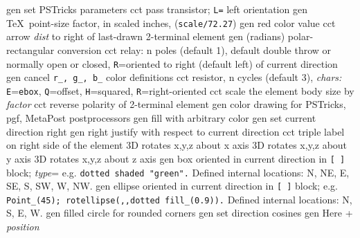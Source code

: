   {gen}
  {set PSTricks parameters}
  {cct}
  {pass transistor; {\tt L=} left orientation}
  {gen}
  {\TeX\ point-size factor, in scaled inches, ({\tt *scale/72.27})}
  {gen}
  {red color value}
  {cct}
  {arrow {\sl dist} to right of last-drawn 2-terminal element}
  {gen}
  {(radians) polar-rectangular conversion}
  {cct}
  {relay: n poles (default 1), default double throw or normally open
    or closed, {\tt R}=oriented to right (default left) of current direction}
  {gen}
  {cancel {\tt r\_, g\_, b\_} color definitions}
  {cct}
  {resistor, n cycles (default 3), {\sl chars:} {\tt E}={\tt ebox},
    {\tt Q}=offset, {\tt H}=squared, {\tt R}=right-oriented }
  {cct}
  {scale the element body size by {\sl factor}}
  {cct}
  {reverse polarity of 2-terminal element}
  {gen}
  {color drawing for PSTricks, pgf, MetaPost postprocessors }
  {gen}
  {fill with arbitrary color}
  {gen}
  {set current direction right}
  {gen}
  {right justify with respect to current direction}
  {cct}
  {triple label on right side of the element}
  {3D}
  {rotates x,y,z about x axis}
  {3D}
  {rotates x,y,z about y axis}
  {3D}
  {rotates x,y,z about z axis}
  {gen}
  {box oriented in current direction in {\tt [ ]} block;
   {\sl type}= e.g. {\tt dotted shaded "green".}  Defined
   internal locations: N, NE, E, SE, S, SW, W, NW. }
  {gen}
  {ellipse oriented in current direction in {\tt [ ]} block;
   e.g. {\tt Point\_(45); rotellipse(,,dotted fill\_(0.9)).} Defined internal
   locations: N, S, E, W.}
  {gen}
  {filled circle for rounded corners}
  {gen}
  {set direction cosines}
  {gen}
  {Here + {\sl position}}
